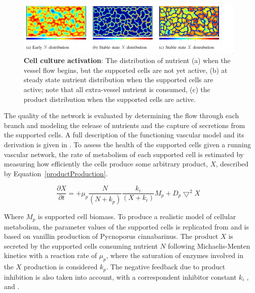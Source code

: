 \begin{figure}[ht]
    \begin{center}
        \includegraphics[width=\textwidth]{./figures/Figure7.JPG}
    \end{center}
    \caption{\textbf{Cell culture activation}: The distribution of nutrient (a) when
    the vessel flow begins, but the supported cells are not yet active, (b) at steady
    state nutrient distribution when the supported cells are active; note that all
    extra-vessel nutrient is consumed, (c) the product distribution when the
    supported cells are active.}
    \vspace{+1mm}
    \label{runningFactory}
\end{figure}

The quality of the network is evaluated by determining the flow through each branch
and modeling the release of nutrients and the capture of secretions from the
supported cells. A full description of the functioning vascular model and its
derivation is given in \cite{Davis2017Exploiting}. To assess the health of the
supported cells given a running vascular network, the rate of metabolism of each
supported cell is estimated by measuring how efficiently the cells produce some
arbitrary product, $X$, described by Equation~\ref{productProduction}.

\begin{equation}
    \frac{\partial X}{\partial t}=+\mu _{p}  \frac{N}{(N+k_p)} \frac{k_i}{(X+k_i)}
    M_p + D_{p}\bigtriangledown^{2} X
    \label{productProduction}
\end{equation}

Where $M_p$ is supported cell biomass. To produce a realistic model of cellular
metabolism, the parameter values of the supported cells is replicated from
\cite{delindavis:Bernard1999Mass} and is based on vanillin production of Pycnoporus
cinnabarinus. The product $X$ is secreted by the supported cells consuming nutrient
$N$ following Michaelis-Menten kinetics with a reaction rate of $\mu _{p}$, where the
saturation of enzymes involved in the $X$ production is considered $k_p$. The
negative feedback due to product inhibition is also taken into account, with a
correspondent inhibitor constant $k_i$ \cite{Han1988Extended},
\cite{Levenspiel1980Monod} and \cite{Aiba1968Kinetics}.


